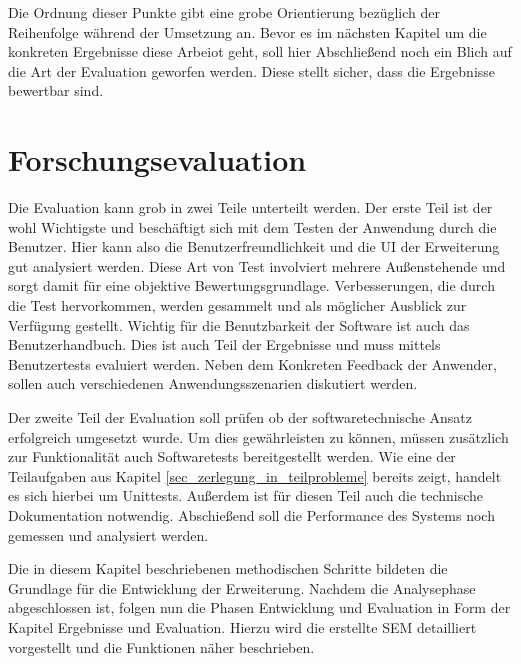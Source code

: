 Die Ordnung dieser Punkte gibt eine grobe Orientierung bezüglich der Reihenfolge
während der Umsetzung an. Bevor es im nächsten Kapitel um die konkreten Ergebnisse
diese Arbeiot geht, soll hier Abschließend noch ein Blich auf die Art der
Evaluation geworfen werden. Diese stellt sicher, dass die Ergebnisse bewertbar
sind.

\section{Forschungsevaluation}
Die Evaluation kann grob in zwei Teile unterteilt werden. Der erste Teil ist der
wohl Wichtigste und beschäftigt sich mit dem Testen der Anwendung durch die Benutzer.
Hier kann also die Benutzerfreundlichkeit und die \ac{UI} der Erweiterung gut analysiert
werden. Diese Art von Test involviert mehrere Außenstehende und sorgt damit für
eine objektive Bewertungsgrundlage. Verbesserungen, die durch die Test
hervorkommen, werden gesammelt und als möglicher Ausblick zur Verfügung gestellt.
Wichtig für die Benutzbarkeit der Software ist auch das Benutzerhandbuch. Dies ist
auch Teil der Ergebnisse und muss mittels Benutzertests evaluiert werden. Neben
dem Konkreten Feedback der Anwender, sollen auch verschiedenen Anwendungsszenarien
diskutiert werden.

Der zweite Teil der Evaluation soll prüfen ob der softwaretechnische Ansatz erfolgreich
umgesetzt wurde. Um dies gewährleisten zu können, müssen zusätzlich zur Funktionalität
auch Softwaretests bereitgestellt werden. Wie eine der Teilaufgaben aus Kapitel
\ref{sec_zerlegung_in_teilprobleme} bereits zeigt, handelt es sich hierbei um Unittests.
Außerdem ist für diesen Teil auch die technische Dokumentation notwendig. Abschießend
soll die Performance des Systems noch gemessen und analysiert werden.

Die in diesem Kapitel beschriebenen methodischen Schritte bildeten die Grundlage
für die Entwicklung der Erweiterung. Nachdem die Analysephase abgeschlossen ist,
folgen nun die Phasen Entwicklung und Evaluation in Form der Kapitel Ergebnisse und
Evaluation. Hierzu wird die erstellte \ac{SEM} detailliert vorgestellt und die Funktionen
näher beschrieben.
